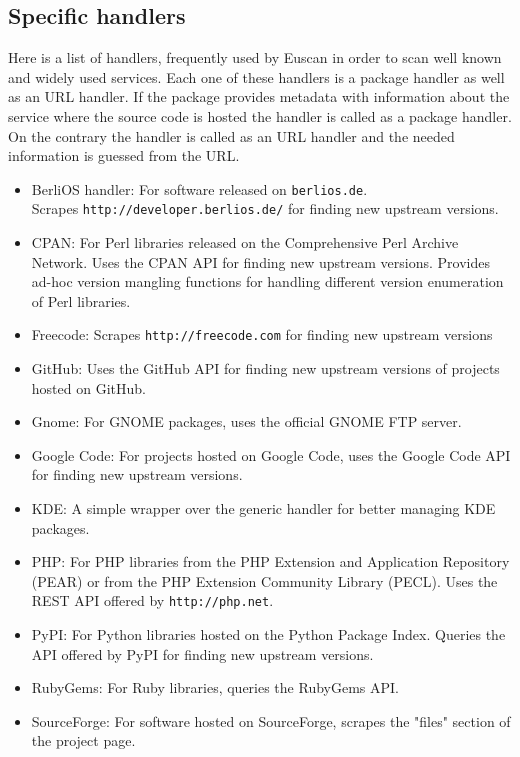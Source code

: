 \subsection{Specific handlers}
Here is a list of handlers, frequently used by Euscan in order to scan well known and widely used services. Each one of these handlers is a package handler as well as an URL handler. If the package provides metadata with information about the service where the source code is hosted the handler is called as a package handler. On the contrary the handler is called as an URL handler and the needed information is guessed from the URL.

\begin{itemize}
\item BerliOS handler: For software released on \texttt{berlios.de}. \\ Scrapes \texttt{http://developer.berlios.de/} for finding new upstream versions.

\item CPAN: For Perl libraries released on the Comprehensive Perl Archive Network. Uses the CPAN API for finding new upstream versions. Provides ad-hoc version mangling functions for handling different version enumeration of Perl libraries.

\item Freecode: Scrapes \texttt{http://freecode.com} for finding new upstream versions

\item GitHub: Uses the GitHub API for finding new upstream versions of projects hosted on GitHub.

\item Gnome: For GNOME packages, uses the official GNOME FTP server.

\item Google Code: For projects hosted on Google Code, uses the Google Code API for finding new upstream versions.

\item KDE: A simple wrapper over the generic handler for better managing KDE packages.

\item PHP: For PHP libraries from the PHP Extension and Application Repository (PEAR) or from the PHP Extension Community Library (PECL). Uses the REST API offered by \texttt{http://php.net}.

\item PyPI: For Python libraries hosted on the Python Package Index. Queries the API offered by PyPI for finding new upstream versions.

\item RubyGems: For Ruby libraries, queries the RubyGems  API.

\item SourceForge: For software hosted on SourceForge, scrapes the "files" section of the project page.
\end{itemize}


